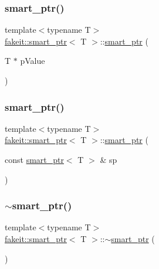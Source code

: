 \subsubsection{\texorpdfstring{smart\_ptr()}{smart\_ptr()}\hspace{0.1cm}{\footnotesize\ttfamily [26/27]}}
{\footnotesize\ttfamily template$<$typename T$>$ \\
\mbox{\hyperlink{classfakeit_1_1smart__ptr}{fakeit\+::smart\+\_\+ptr}}$<$ T $>$\+::\mbox{\hyperlink{classfakeit_1_1smart__ptr}{smart\+\_\+ptr}} (\begin{DoxyParamCaption}\item[{T $\ast$}]{p\+Value }\end{DoxyParamCaption})\hspace{0.3cm}{\ttfamily [inline]}}

\mbox{\label{classfakeit_1_1smart__ptr_a1157d28b4675e32ae90886871fb1b0bd}} 
\subsubsection{\texorpdfstring{smart\_ptr()}{smart\_ptr()}\hspace{0.1cm}{\footnotesize\ttfamily [27/27]}}
{\footnotesize\ttfamily template$<$typename T$>$ \\
\mbox{\hyperlink{classfakeit_1_1smart__ptr}{fakeit\+::smart\+\_\+ptr}}$<$ T $>$\+::\mbox{\hyperlink{classfakeit_1_1smart__ptr}{smart\+\_\+ptr}} (\begin{DoxyParamCaption}\item[{const \mbox{\hyperlink{classfakeit_1_1smart__ptr}{smart\+\_\+ptr}}$<$ T $>$ \&}]{sp }\end{DoxyParamCaption})\hspace{0.3cm}{\ttfamily [inline]}}

\mbox{\label{classfakeit_1_1smart__ptr_a0a184c081564a5a22d8ad0a121614bc5}} 
\subsubsection{\texorpdfstring{$\sim$smart\_ptr()}{~smart\_ptr()}\hspace{0.1cm}{\footnotesize\ttfamily [9/9]}}
{\footnotesize\ttfamily template$<$typename T$>$ \\
\mbox{\hyperlink{classfakeit_1_1smart__ptr}{fakeit\+::smart\+\_\+ptr}}$<$ T $>$\+::$\sim$\mbox{\hyperlink{classfakeit_1_1smart__ptr}{smart\+\_\+ptr}} (\begin{DoxyParamCaption}{ }\end{DoxyParamCaption})\hspace{0.3cm}{\ttfamily [inline]}}



